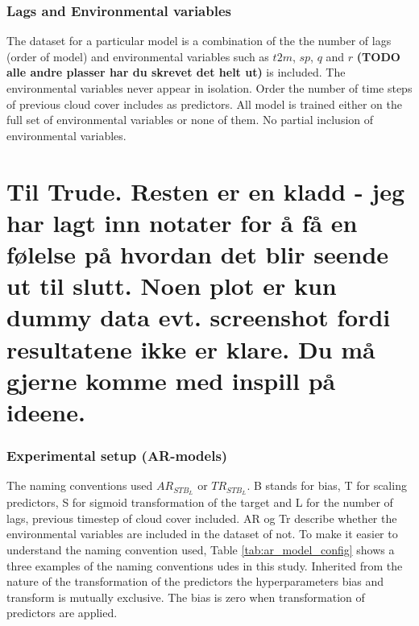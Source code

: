 \subsubsection{Lags and Environmental variables}
The dataset for a particular model is a combination of the the number of lags (order of model) and environmental variables such as $t2m$, $sp$, $q$ and $r$ \textbf{(TODO alle andre plasser har du skrevet det helt ut)} is included. The environmental variables never appear in isolation.
Order the number of time steps of previous cloud cover includes as predictors. All model is trained either on the full set of environmental variables or none of them. No partial inclusion of environmental variables. 

\section{Til Trude. Resten er en kladd - jeg har lagt inn notater for å få en følelse på hvordan det blir seende ut til slutt. Noen plot er kun dummy data evt. screenshot fordi resultatene ikke er klare. Du må gjerne komme med inspill på ideene.}

\subsubsection{Experimental setup (AR-models)}
The naming conventions used $AR_{STB_L}$ or $TR_{STB_L}$. B stands for bias, T for scaling predictors, S for sigmoid transformation of the target and L for the number of lags, previous timestep of cloud cover included. AR og Tr describe whether the environmental variables are included in the dataset of not. %
To make it easier to understand the naming convention used, Table \ref{tab:ar_model_config} shows a three examples of the naming conventions udes in this study. %
Inherited from the nature of the transformation of the predictors the hyperparameters bias and transform is mutually exclusive. The bias is zero when transformation of predictors are applied. 

